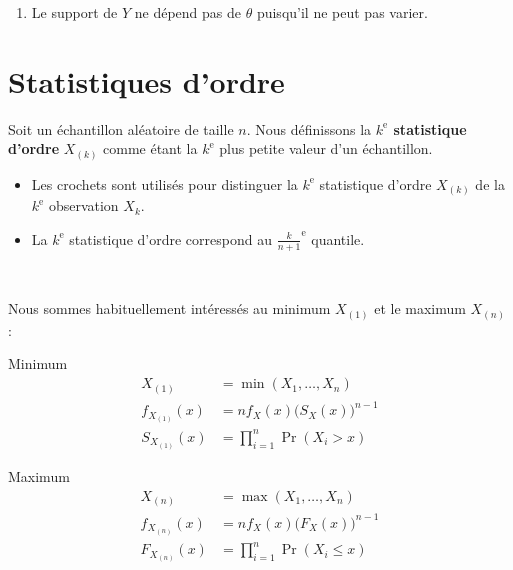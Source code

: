 \documentclass[10pt, french]{article}
\begin{document}
\begin{multicols*}{2}
\begin{enumerate}
	\item 	Le support de $Y$ ne dépend pas de $\theta$ puisqu'il ne peut pas varier.
\end{enumerate}

\columnbreak
\section{Statistiques d'ordre}
\label{subsec:orderStats}

Soit un échantillon aléatoire de taille $n$.
Nous définissons la \textbf{$k^{\text{e}}$ statistique d'ordre} $X_{(k)}$ comme étant la $k^{\text{e}}$ plus petite valeur d'un échantillon.
\begin{itemize}
	\item	Les crochets sont utilisés pour distinguer la $k^{\text{e}}$ statistique d'ordre $X_{(k)}$ de la $k^{\text{e}}$ observation $X_{k}$.
	\item	La $k^{\text{e}}$ statistique d'ordre correspond au $\frac{k}{n + 1}^{\text{e}}$ quantile.
\end{itemize}

\

Nous sommes habituellement intéressés au minimum $X_{(1)}$ et le maximum $X_{(n)}$ :

\setlength{\mathindent}{-0.75cm}
\begin{minipage}{0.5\columnwidth}
\begin{algo}{Minimum}
\begin{align*}
	X_{(1)}
	&=	\min(X_{1}, \dots, X_{n})	\\
	f_{X_{(1)}}(x)
	&=	n f_{X}(x) \big( S_{X}(x) \big)^{n - 1}	\\
	S_{X_{(1)}}(x)
	&=	\prod_{i = 1}^{n} \Pr(X_{i} > x)
\end{align*}
\end{algo}
\end{minipage}
\begin{minipage}{0.5\columnwidth}
\begin{algo}{Maximum}
\begin{align*}
	X_{(n)}
	&=	\max(X_{1}, \dots, X_{n})	\\
	f_{X_{(n)}}(x)
	&=	n f_{X}(x) \big( F_{X}(x) \big)^{n - 1}	\\
	F_{X_{(n)}}(x)
	&=	\prod_{i = 1}^{n} \Pr(X_{i} \le x)
\end{align*}
\end{algo}
\end{minipage}
\setlength{\mathindent}{1cm}


\end{multicols*}
\end{document}
